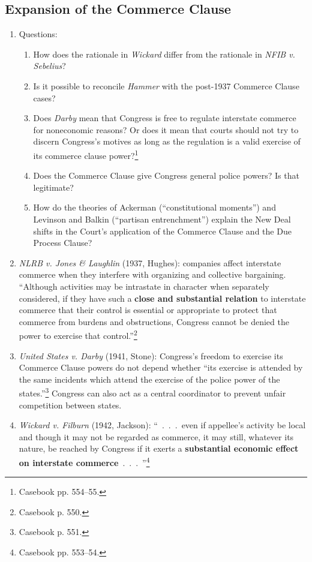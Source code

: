 \subsection{Expansion of the Commerce Clause}

\begin{enumerate}
    \item Questions:
    \begin{enumerate}
        \item How does the rationale in \emph{Wickard} differ from the 
        rationale in \emph{NFIB v. Sebelius}?
        \item Is it possible to reconcile \emph{Hammer} with the post-1937 
        Commerce Clause cases?
        \item Does \emph{Darby} mean that Congress is free to regulate 
        interstate commerce for noneconomic reasons? Or does it mean that 
        courts should not try to discern Congress's motives as long as the 
        regulation is a valid exercise of its commerce clause 
        power?\footnote{Casebook pp. 554--55.}
        \item Does the Commerce Clause give Congress general police powers? Is 
        that legitimate?
        \item How do the theories of Ackerman (``constitutional moments'') and 
        Levinson and Balkin (``partisan entrenchment'') explain the New Deal 
        shifts in the Court's application of the Commerce Clause and the Due 
        Process Clause?
    \end{enumerate}
    \item \emph{NLRB v. Jones \& Laughlin} (1937, Hughes): companies affect 
    interstate commerce when they interfere with organizing and collective 
    bargaining. ``Although activities may be intrastate in character when 
    separately considered, if they have such a \textbf{close and substantial 
    relation} to interstate commerce that their control is essential or 
    appropriate to protect that commerce from burdens and obstructions, 
    Congress cannot be denied the power to exercise that 
    control.''\footnote{Casebook p. 550.}
    \item \emph{United States v. Darby} (1941, Stone): Congress's freedom to 
    exercise its Commerce Clause powers do not depend whether ``its exercise 
    is attended by the same incidents which attend the exercise of the police 
    power of the states.''\footnote{Casebook p. 551.} Congress can also act as 
    a central coordinator to prevent unfair competition between states.
    \item \emph{Wickard v. Filburn} (1942, Jackson): ``~.~.~.~even if 
    appellee's activity be local and though it may not be regarded as 
    commerce, it may still, whatever its nature, be reached by Congress if it 
    exerts a \textbf{substantial economic effect on interstate 
    commerce}~.~.~.~''\footnote{Casebook pp. 553--54.}
\end{enumerate}

